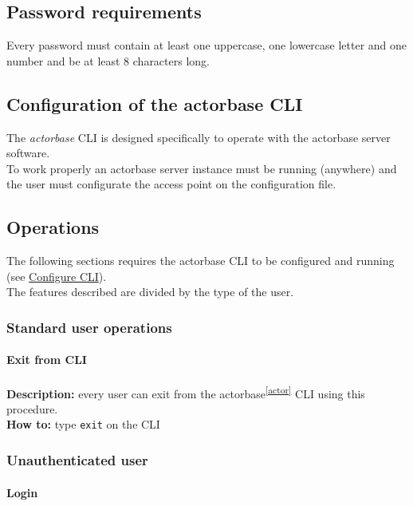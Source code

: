 \documentclass{scalatekids-article}
\begin{document}
\subsection{Password requirements}
\label{sec:passwordrequirement}
Every password must contain at least one uppercase, one lowercase letter and one
number and be at least 8 characters long.

\subsection{Configuration of the actorbase CLI}
\label{sec:configurationcli}
The \textit{actorbase} CLI is designed specifically to operate
with the actorbase server software.\\
To work properly an actorbase server instance must be running
(anywhere) and the user must configurate the access point on the configuration file.

\subsection{Operations}

The following sections requires the actorbase CLI to be configured and
running (see \hyperref[sec:configurationcli]{Configure CLI}).\\
The features described are divided by the type of the user.

\subsubsection{Standard user operations}
\label{sec:everyuser}
\paragraph{Exit from CLI}

\textbf{Description:} every user can exit from the actorbase\textsuperscript{\ref{actor}} CLI
using this procedure.\\
\textbf{How to:} type \texttt{exit} on the CLI

\subsubsection{Unauthenticated user}
\label{sec:unauthenticateduser}

\paragraph{Login}
\end{document}
